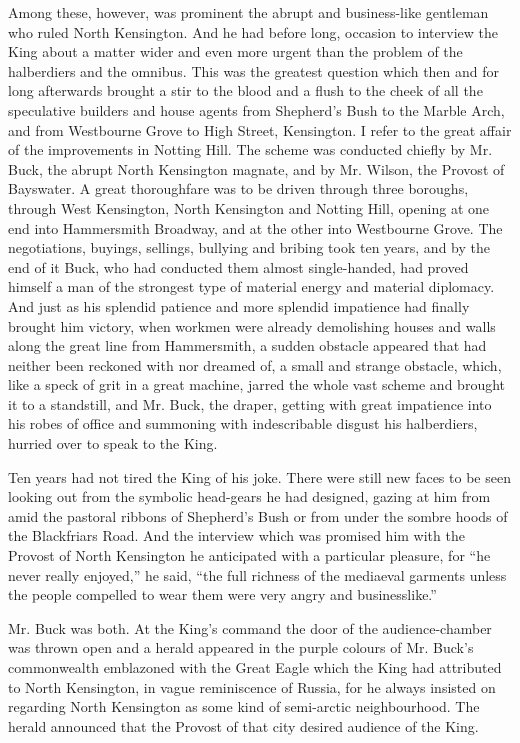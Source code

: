 \documentclass{book}
\begin{document}
Among these, however, was prominent the abrupt and business-like gentleman who ruled North Kensington. And he had before long, occasion to interview the King about a matter wider and even more urgent than the problem of the halberdiers and the omnibus. This was the greatest question which then and for long afterwards brought a stir to the blood and a flush to the cheek of all the speculative builders and house agents from Shepherd’s Bush to the Marble Arch, and from Westbourne Grove to High Street, Kensington. I refer to the great affair of the improvements in Notting Hill. The scheme was conducted chiefly by Mr. Buck, the abrupt North Kensington magnate, and by Mr. Wilson, the Provost of Bayswater. A great thoroughfare was to be driven through three boroughs, through West Kensington, North Kensington and Notting Hill, opening at one end into Hammersmith Broadway, and at the other into Westbourne Grove. The negotiations, buyings, sellings, bullying and bribing took ten years, and by the end of it Buck, who had conducted them almost single-handed, had proved himself a man of the strongest type of material energy and material diplomacy. And just as his splendid patience and more splendid impatience had finally brought him victory, when workmen were already demolishing houses and walls along the great line from Hammersmith, a sudden obstacle appeared that had neither been reckoned with nor dreamed of, a small and strange obstacle, which, like a speck of grit in a great machine, jarred the whole vast scheme and brought it to a standstill, and Mr. Buck, the draper, getting with great impatience into his robes of office and summoning with indescribable disgust his halberdiers, hurried over to speak to the King.

Ten years had not tired the King of his joke. There were still new faces to be seen looking out from the symbolic head-gears he had designed, gazing at him from amid the pastoral ribbons of Shepherd’s Bush or from under the sombre hoods of the Blackfriars Road. And the interview which was promised him with the Provost of North Kensington he anticipated with a particular pleasure, for “he never really enjoyed,” he said, “the full richness of the mediaeval garments unless the people compelled to wear them were very angry and businesslike.”

Mr. Buck was both. At the King’s command the door of the audience-chamber was thrown open and a herald appeared in the purple colours of Mr. Buck’s commonwealth emblazoned with the Great Eagle which the King had attributed to North Kensington, in vague reminiscence of Russia, for he always insisted on regarding North Kensington as some kind of semi-arctic neighbourhood. The herald announced that the Provost of that city desired audience of the King.
\end{document}
